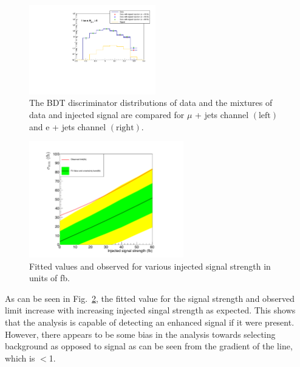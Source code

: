 \begin{figure}[ht!]
     \includegraphics[width=0.49\textwidth]{images/Run1/SignalInjection_El_8j.pdf}          
    \caption{The BDT discriminator distributions of data and the mixtures of data and injected signal are compared for $\mu$ + jets channel $\left( \textrm{left} \right)$ and e + jets channel $\left( \textrm{right} \right)$. }
    \label{fig:SigInjection}
\end{figure}

\begin{figure}[!ht]
\centering
    \includegraphics[width=0.6\textwidth]{images/Run1/siginj.pdf}
    \caption{Fitted values and observed for various injected signal strength in units of fb.}
    \label{fig:SigInjectionBrazil}
\end{figure}

As can be seen in Fig.~\ref{fig:SigInjectionBrazil}, the fitted value for the signal strength and observed limit increase with increasing injected singal strength as expected. This shows that the analysis is capable of detecting an enhanced signal if it were present. However, there appears to be some bias in the analysis towards selecting background as opposed to signal as can be seen from the gradient of the line, which is $<$1.




